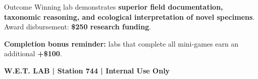 \documentclass[10pt]{article}
\begin{document}
\vspace{6pt}

\begin{labbox}{Outcome}
Winning lab demonstrates \textbf{superior field documentation, taxonomic reasoning, and ecological interpretation of novel specimens}. Award disbursement: \textbf{\$250 research funding}.

\vspace{3pt}
\textbf{Completion bonus reminder:} labs that complete all mini-games earn an additional \textbf{+\$100}.
\end{labbox}

\vfill
\begin{center}
\footnotesize\color{agencyblue}\textbf{W.E.T. LAB | Station 744 | Internal Use Only}
\end{center}
\end{document}
